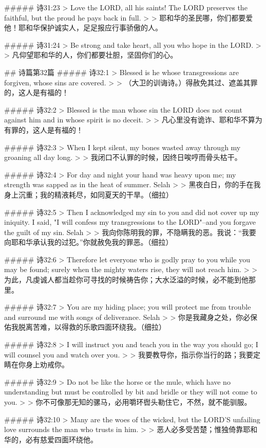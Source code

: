 ##### 诗31:23
> Love the LORD, all his saints! The LORD preserves the faithful, but the proud he pays back in full.
>
> 耶和华的圣民哪，你们都要爱他！耶和华保护诚实人，足足报应行事骄傲的人。


##### 诗31:24
> Be strong and take heart, all you who hope in the LORD.
>
> 凡仰望耶和华的人，你们都要壮胆，坚固你们的心。


## 诗篇第32篇
##### 诗32:1
> Blessed is he whose transgressions are forgiven, whose sins are covered.
>
> （大卫的训诲诗。）得赦免其过、遮盖其罪的，这人是有福的！


##### 诗32:2
> Blessed is the man whose sin the LORD does not count against him and in whose spirit is no deceit.
>
> 凡心里没有诡诈、耶和华不算为有罪的，这人是有福的！


##### 诗32:3
> When I kept silent, my bones wasted away through my groaning all day long.
>
> 我闭口不认罪的时候，因终日唉哼而骨头枯干。


##### 诗32:4
> For day and night your hand was heavy upon me; my strength was sapped as in the heat of summer. Selah
>
> 黑夜白日，你的手在我身上沉重；我的精液耗尽，如同夏天的干旱。（细拉）


##### 诗32:5
> Then I acknowledged my sin to you and did not cover up my iniquity. I said, "I will confess my transgressions to the LORD"--and you forgave the guilt of my sin. Selah
>
> 我向你陈明我的罪，不隐瞒我的恶。我说：“我要向耶和华承认我的过犯。”你就赦免我的罪恶。（细拉）


##### 诗32:6
> Therefore let everyone who is godly pray to you while you may be found; surely when the mighty waters rise, they will not reach him.
>
> 为此，凡虔诚人都当趁你可寻找的时候祷告你；大水泛溢的时候，必不能到他那里。


##### 诗32:7
> You are my hiding place; you will protect me from trouble and surround me with songs of deliverance. Selah
>
> 你是我藏身之处，你必保佑我脱离苦难，以得救的乐歌四面环绕我。（细拉）


##### 诗32:8
> I will instruct you and teach you in the way you should go; I will counsel you and watch over you.
>
> 我要教导你，指示你当行的路；我要定睛在你身上劝戒你。


##### 诗32:9
> Do not be like the horse or the mule, which have no understanding but must be controlled by bit and bridle or they will not come to you.
>
> 你不可像那无知的骡马，必用嚼环辔头勒住它，不然，就不能驯服。


##### 诗32:10
> Many are the woes of the wicked, but the LORD'S unfailing love surrounds the man who trusts in him.
>
> 恶人必多受苦楚；惟独倚靠耶和华的，必有慈爱四面环绕他。


